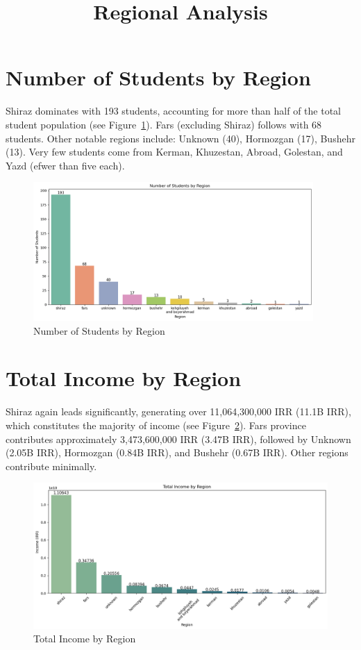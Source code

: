 \documentclass[12pt,a4paper]{article}
\title{Regional Analysis}
\date{}
\begin{document}
\maketitle

\section{Number of Students by Region}
Shiraz dominates with 193 students, accounting for more than half of the total student population (see Figure~\ref{fig:students-region}). Fars (excluding Shiraz) follows with 68 students. Other notable regions include: Unknown (40), Hormozgan (17), Bushehr (13). Very few students come from Kerman, Khuzestan, Abroad, Golestan, and Yazd (efwer than five each).

\begin{figure}[h!]
    \centering
    \includegraphics[width=0.95\textwidth]{Number of Students by Region.png}
    \caption{Number of Students by Region}
    \label{fig:students-region}
\end{figure}

\section{Total Income by Region}
Shiraz again leads significantly, generating over 11,064,300,000 IRR (11.1B IRR), which constitutes the majority of income (see Figure~\ref{fig:income-region}). Fars province contributes approximately 3,473,600,000 IRR (3.47B IRR), followed by Unknown (2.05B IRR), Hormozgan (0.84B IRR), and Bushehr (0.67B IRR). Other regions contribute minimally.

\begin{figure}[h!]
    \centering
    \includegraphics[width=1\textwidth]{Total Income by Region.png}
    \caption{Total Income by Region}
    \label{fig:income-region}
\end{figure}
\end{document}
